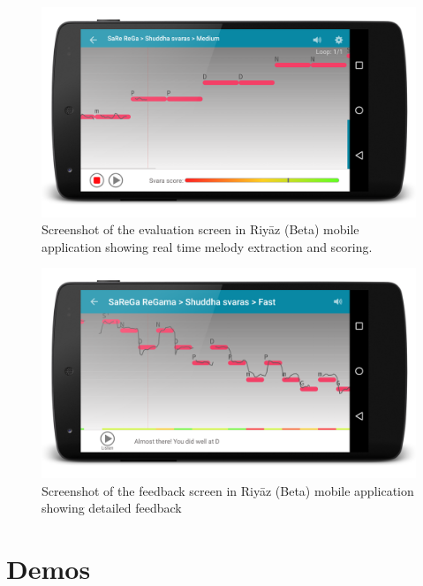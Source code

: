 \begin{figure}[h]
	\begin{center}
		\includegraphics[width=\figSizeSeventy]{ch08_applications/figures/riyaz1.png}
	\end{center}
	\caption{Screenshot of the evaluation screen in Riy\={a}z (Beta) mobile application showing real time melody extraction and scoring.}
	\label{fig:riyaz_evaluation_screen}
\end{figure}
\begin{figure}[h]
	\begin{center}
		\includegraphics[width=\figSizeSeventy]{ch08_applications/figures/riyaz2.png}
	\end{center}
	\caption{Screenshot of the feedback screen in Riy\={a}z (Beta) mobile application showing detailed feedback}
	\label{fig:riyaz_feedback_screen}
\end{figure}



\section{Demos}

